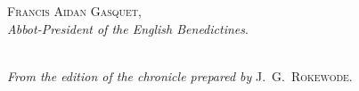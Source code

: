 \documentclass[10pt]{book}
\begin{document}
\begin{flushright}
\parbox{6cm}{
\begin{center}
\textsc{Francis Aidan Gasquet},\\
\vspace{0.1cm}
\emph{Abbot-President of the English Benedictines}.
\end{center}
}
\end{flushright}


\cleardoublepage


\begin{center}
{\fontsize{13}{13} \selectfont
{}\\}
\vspace{.2cm}
\emph{From the edition of the chronicle prepared by} \textsc{J.\ G.\ Rokewode.}
\end{center}

\vspace{.15cm}
\end{document}
